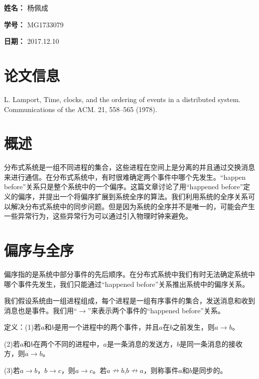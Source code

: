 \documentclass[UTF8]{article}
\begin{document}
    
{\flushleft \bf \Large 姓名：} 杨佩成

{\flushleft \bf \Large 学号：} MG1733079

{\flushleft \bf \Large 日期：} 2017.12.10


\section*{论文信息}
    
L. Lamport, Time, clocks, and the ordering of events in a distributed system. Communications of the ACM. 21, 558–565 (1978).


\section{概述}

	分布式系统是一组不同进程的集合，这些进程在空间上是分离的并且通过交换消息来进行通信。在分布式系统中，有时很难确定两个事件中哪个先发生。“happen before”关系只是整个系统中的一个偏序。这篇文章讨论了用“happened before”定义的偏序，并提出一个将偏序扩展到系统全序的算法。我们利用系统的全序关系可以解决分布式系统中的同步问题。但是因为系统的全序并不是唯一的，可能会产生一些异常行为，这些异常行为可以通过引入物理时钟来避免。

\section{偏序与全序}

	偏序指的是系统中部分事件的先后顺序。在分布式系统中我们有时无法确定系统中哪个事件先发生，我们只能通过“happened before”关系推出系统中的偏序关系。

	我们假设系统由一组进程组成，每个进程是一组有序事件的集合，发送消息和收到消息也是事件。我们用“$\to$”来表示两个事件的“happened before”关系。

	定义：(1)若$a$和$b$是用一个进程中的两个事件，并且$a$在$b$之前发生，则$a \to b$。

		(2)若$a$和$b$在两个不同的进程中，$a$是一条消息的发送方，$b$是同一条消息的接收方，则$a \to b$。

		(3)若$a \to b$，$b \to c$，则$a \to c$。若$a \nrightarrow b$,$b \nrightarrow a$，则称事件$a$和$b$是同步的。
\end{document}
